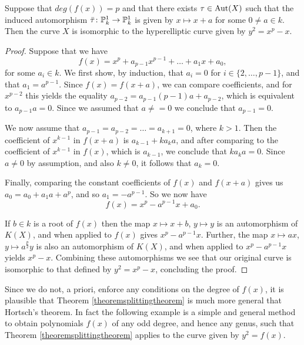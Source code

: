     \begin{lem}
    Suppose that $deg(f(x)) = p$ and that there exists $\tau \in \operatorname{Aut}(X)$ such that the induced automorphism $\bar \tau \colon {\mathbb P}_k^1 \rightarrow {\mathbb P}_k^1$ is given by $x \mapsto x+a$ for some $0 \neq a \in k$.
    Then the curve $X$ is isomorphic to the hyperelliptic curve given by $y^2 = x^p - x$.
    \end{lem}
    \begin{proof}
    Suppose that we have
        \[
        f(x) = x^p + a_{p-1}x^{p-1} + \ldots + a_1x + a_0,
        \]
    for some $a_i \in k$.
    We first show, by induction, that $a_i = 0$ for $i \in \{2, \ldots, p-1\}$, and that $a_1 = a^{p-1}$.
    Since $f(x) = f(x+a)$, we can compare coefficients, and for $x^{p-2}$ this yields the equality $a_{p-2} = a_{p-1}(p-1)a + a_{p-2}$, which is equivalent to $a_{p-1}a = 0$.
    Since we assumed that $a \neq = 0$ we conclude that $a_{p-1} = 0$.

    We now assume that $a_{p-1} = a_{p-2} = \ldots = a_{k+1} = 0$, where $k >1$.
    Then the coefficient of $x^{k-1}$ in $f(x+a)$ is $a_{k-1} + ka_ka$, and after comparing to the coefficient of $x^{k-1}$ in $f(x)$, which is $a_{k-1}$, we conclude that $ka_ka = 0$.
    Since $a \neq 0$ by assumption, and also $k \neq 0$, it follows that $a_k = 0$.

    Finally, comparing the constant coefficients of $f(x)$ and $f(x+a)$ gives us $a_0 = a_0 + a_1a + a^p$, and so $a_1 = - a^{p-1}$.
    So we now have
        \[
        f(x) = x^p - a^{p-1}x + a_0.
        \]
    
    If $b \in k$ is a root of $f(x)$ then the map $x \mapsto x+b$, $y \mapsto y$ is an automorphism of $K(X)$, and when applied to $f(x)$ gives $x^p - a^{p-1}x$.
    Further, the map $x \mapsto ax$, $y \mapsto a^{\frac{p}{2}}y$ is also an automorphism of $K(X)$, and when applied to $x^p - a^{p-1}x$ yields $x^p - x$.
    Combining these automorphisms we see that our original curve is isomorphic to that defined by $y^2 = x^p - x$, concluding the proof.
    \end{proof}

    Since we do not, a priori, enforce any conditions on the degree of $f(x)$, it is plausible that Theorem \ref{theoremsplittingtheorem} is much more general that Hortsch's theorem. In fact the following example is a simple and general method to obtain polynomials $f(x)$ of any odd degree, and hence any genus, such that Theorem \ref{theoremsplittingtheorem} applies to the curve given by $y^2 = f(x)$.


